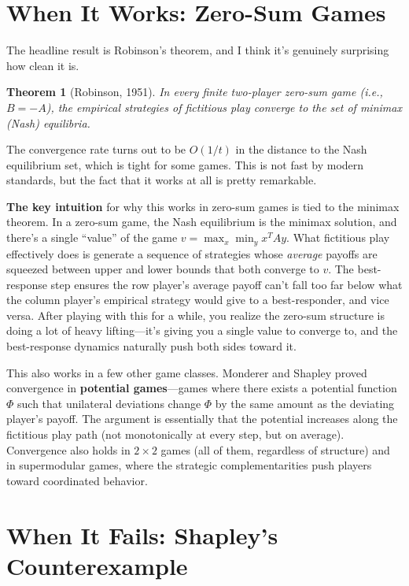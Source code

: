 \documentclass[11pt]{article}
\newtheorem{theorem}{Theorem}
\begin{document}
\section{When It Works: Zero-Sum Games}

The headline result is Robinson's theorem, and I think it's genuinely surprising how clean it is.

\begin{theorem}[Robinson, 1951]
In every finite two-player zero-sum game (i.e., $B = -A$), the empirical strategies of fictitious play converge to the set of minimax (Nash) equilibria.
\end{theorem}

The convergence rate turns out to be $O(1/t)$ in the distance to the Nash equilibrium set, which is tight for some games. This is not fast by modern standards, but the fact that it works at all is pretty remarkable.

\textbf{The key intuition} for why this works in zero-sum games is tied to the minimax theorem. In a zero-sum game, the Nash equilibrium is the minimax solution, and there's a single ``value'' of the game $v = \max_x \min_y x^T A y$. What fictitious play effectively does is generate a sequence of strategies whose \emph{average} payoffs are squeezed between upper and lower bounds that both converge to $v$. The best-response step ensures the row player's average payoff can't fall too far below what the column player's empirical strategy would give to a best-responder, and vice versa. After playing with this for a while, you realize the zero-sum structure is doing a lot of heavy lifting---it's giving you a single value to converge to, and the best-response dynamics naturally push both sides toward it.

This also works in a few other game classes. Monderer and Shapley \cite{monderer1996} proved convergence in \textbf{potential games}---games where there exists a potential function $\Phi$ such that unilateral deviations change $\Phi$ by the same amount as the deviating player's payoff. The argument is essentially that the potential increases along the fictitious play path (not monotonically at every step, but on average). Convergence also holds in $2 \times 2$ games (all of them, regardless of structure) and in supermodular games, where the strategic complementarities push players toward coordinated behavior.

\section{When It Fails: Shapley's Counterexample}
\end{document}
